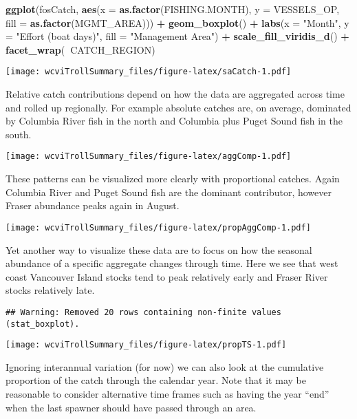 \documentclass[]{article}
\newenvironment{Shaded}{\begin{snugshade}}{\end{snugshade}}
\newcommand{\DataTypeTok}[1]{\textcolor[rgb]{0.13,0.29,0.53}{#1}}
\newcommand{\KeywordTok}[1]{\textcolor[rgb]{0.13,0.29,0.53}{\textbf{#1}}}
\newcommand{\NormalTok}[1]{#1}
\newcommand{\OperatorTok}[1]{\textcolor[rgb]{0.81,0.36,0.00}{\textbf{#1}}}
\newcommand{\StringTok}[1]{\textcolor[rgb]{0.31,0.60,0.02}{#1}}
\begin{document}
\begin{Shaded}
\begin{Highlighting}[]
\KeywordTok{ggplot}\NormalTok{(fosCatch, }\KeywordTok{aes}\NormalTok{(}\DataTypeTok{x =} \KeywordTok{as.factor}\NormalTok{(FISHING.MONTH), }\DataTypeTok{y =}\NormalTok{ VESSELS_OP, }
                             \DataTypeTok{fill =} \KeywordTok{as.factor}\NormalTok{(MGMT_AREA))) }\OperatorTok{+}
\StringTok{  }\KeywordTok{geom_boxplot}\NormalTok{() }\OperatorTok{+}
\StringTok{  }\KeywordTok{labs}\NormalTok{(}\DataTypeTok{x =} \StringTok{"Month"}\NormalTok{, }\DataTypeTok{y =} \StringTok{"Effort (boat days)"}\NormalTok{, }\DataTypeTok{fill =} \StringTok{"Management Area"}\NormalTok{) }\OperatorTok{+}
\StringTok{  }\KeywordTok{scale_fill_viridis_d}\NormalTok{() }\OperatorTok{+}
\StringTok{  }\KeywordTok{facet_wrap}\NormalTok{(}\OperatorTok{~}\NormalTok{CATCH_REGION)}
\end{Highlighting}
\end{Shaded}

\texttt{[image: wcviTrollSummary\_files/figure-latex/saCatch-1.pdf]}

Relative catch contributions depend on how the data are aggregated
across time and rolled up regionally. For example absolute catches are,
on average, dominated by Columbia River fish in the north and Columbia
plus Puget Sound fish in the south.

\texttt{[image: wcviTrollSummary\_files/figure-latex/aggComp-1.pdf]}

These patterns can be visualized more clearly with proportional catches.
Again Columbia River and Puget Sound fish are the dominant contributor,
however Fraser abundance peaks again in August.

\texttt{[image: wcviTrollSummary\_files/figure-latex/propAggComp-1.pdf]}

Yet another way to visualize these data are to focus on how the seasonal
abundance of a specific aggregate changes through time. Here we see that
west coast Vancouver Island stocks tend to peak relatively early and
Fraser River stocks relatively late.

\begin{verbatim}
## Warning: Removed 20 rows containing non-finite values (stat_boxplot).
\end{verbatim}

\texttt{[image: wcviTrollSummary\_files/figure-latex/propTS-1.pdf]}

Ignoring interannual variation (for now) we can also look at the
cumulative proportion of the catch through the calendar year. Note that
it may be reasonable to consider alternative time frames such as having
the year ``end'' when the last spawner should have passed through an
area.
\end{document}
